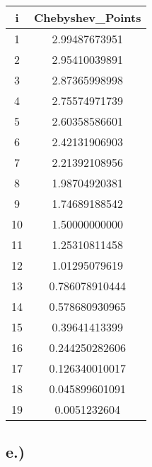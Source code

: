 \documentclass{article}
\begin{document}
\begin{center}
    \begin{tabular}{||c| c||} 
    \hline
    \textbf{i } & \textbf{Chebyshev_Points} \\ [0.5ex] 
    \hline\hline
    1  &  2.99487673951\\[1ex] 
    \hline
    2  &  2.95410039891\\[1ex]
    \hline
    3  &  2.87365998998\\[1ex]
    \hline
    4  &  2.75574971739\\[1ex]
    \hline
    5  &  2.60358586601\\[1ex]
    \hline
    6  &  2.42131906903\\[1ex]
    \hline
    7  &  2.21392108956\\[1ex]
    \hline
    8  &  1.98704920381\\[1ex]
    \hline
    9  &  1.74689188542\\[1ex]
    \hline
    10 &  1.50000000000\\[1ex]
    \hline
    11 &   1.25310811458\\[1ex]
    \hline
    12 &   1.01295079619\\[1ex]
    \hline
    13 &   0.786078910444\\[1ex]
    \hline
    14 &     0.578680930965\\[1ex]
    \hline
    15 &   0.39641413399\\[1ex]
    \hline
    16 &  0.244250282606\\[1ex]
    \hline
    17 &  0.126340010017\\[1ex]
    \hline
    18 &   0.045899601091\\[1ex]
        \hline
    19 &    0.0051232604\\[1ex]
    \hline
    \end{tabular}
\end{center}


\pagebreak

\subsection*{e.)}
\end{document}
